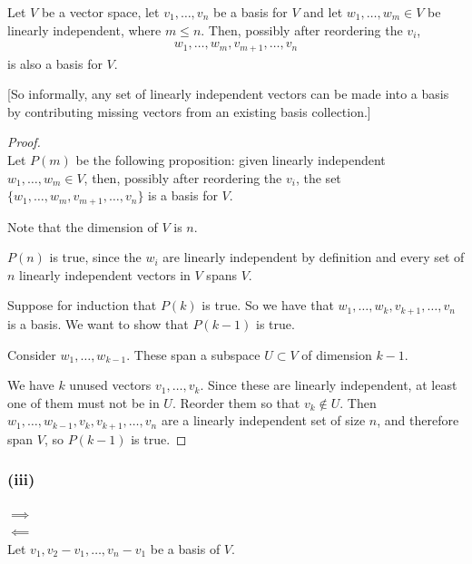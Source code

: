 \documentclass[12pt]{article}
\begin{document}
\begin{theorem*}
  Let $V$ be a vector space, let $v_1, \ldots, v_n$ be a basis for $V$ and
  let $w_1, \ldots, w_m \in V$ be linearly independent, where $m \leq
  n$. Then, possibly after reordering the $v_i$,
  \begin{align*}
    w_1, \ldots, w_m, v_{m+1}, \ldots, v_n
  \end{align*}
  is also a basis for $V$.
\end{theorem*}

[So informally, any set of linearly independent vectors can be made into a
basis by contributing missing vectors from an existing basis collection.]

\begin{proof}~\\
  Let $P(m)$ be the following proposition: given linearly independent
  $w_1, \ldots, w_m \in V$, then, possibly after reordering the $v_i$, the set
  $\{w_1, \ldots, w_m, v_{m+1}, \ldots, v_n\}$ is a basis for $V$.

  Note that the dimension of $V$ is $n$.

  $P(n)$ is true, since the $w_i$ are linearly independent by definition and
  every set of $n$ linearly independent vectors in $V$ spans $V$.

  Suppose for induction that $P(k)$ is true. So we have that
  $w_1, \ldots, w_k, v_{k+1}, \ldots, v_n$ is a basis. We want to show that
  $P(k-1)$ is true.

  Consider $w_1, \ldots, w_{k-1}$. These span a subspace $U \subset V$ of
  dimension $k-1$.

  We have $k$ unused vectors $v_1, \ldots, v_k$. Since these are linearly
  independent, at least one of them must not be in $U$. Reorder them so that
  $v_k \notin U$. Then $w_1, \ldots, w_{k-1}, v_k, v_{k+1}, \ldots, v_n$ are a
  linearly independent set of size $n$, and therefore span $V$, so $P(k-1)$ is
  true.


\end{proof}

\newpage
\subsubsection*{(iii)}

$\implies$\\


$\impliedby$\\
Let $v_1, v_2 - v_1, \ldots, v_n - v_1$ be a basis of $V$.
\end{document}

